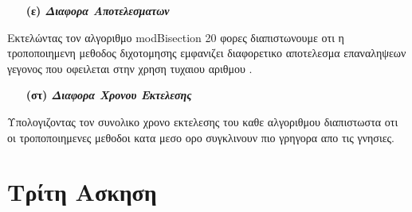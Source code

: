 \documentclass[a4paper,11pt]{article}
\begin{document}
	\begin{enumerate}
		\item[\textbf{(ε)}] \emph {\textbf{Διαφορα  Αποτελεσματων}}
	\end{enumerate}
	\begin{center}
		Εκτελώντας τον αλγοριθμο modBisection 20 φορες διαπιστωνουμε οτι η τροποποιημενη μεθοδος διχοτομησης εμφανιζει διαφορετικο αποτελεσμα επαναληψεων γεγονος που οφειλεται στην χρηση τυχαιου αριθμου .
	\end{center}
	\begin{enumerate}
		\item[\textbf{(στ)}] \emph {\textbf{Διαφορα  Χρονου Εκτελεσης}}
	\end{enumerate}
	\begin{center}
		Υπολογιζοντας τον συνολικο χρονο εκτελεσης του καθε αλγοριθμου διαπιστωστα οτι οι τροποποιημενες μεθοδοι κατα μεσο ορο συγκλινουν πιο γρηγορα απο τις γνησιες.
	\end{center}
	\begin{enumerate}
		\item[\text{(a)}] {}
		\item[\text{(b)}] {}
		\item[\text{(c)}] {}
	\end{enumerate}
\vspace{0,5cm}
	\begin{enumerate}
		\item[\text{(a)}] {}
		\item[\text{(b)}] {}
		\item[\text{(c)}] {}
	\end{enumerate}
\vspace{4cm}
	\section{Τρίτη Ασκηση}
	
\end{document}

